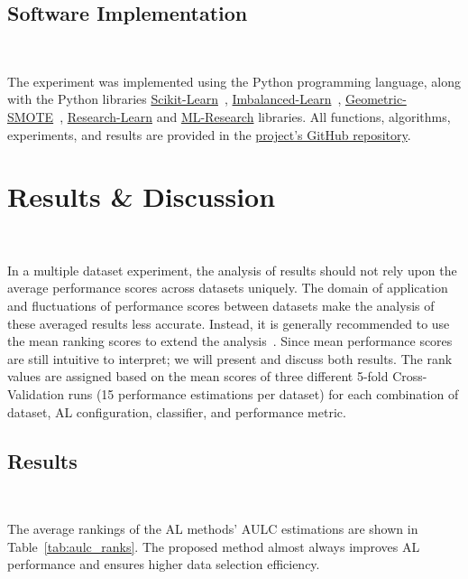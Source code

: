 \documentclass[parskip=full]{scrartcl}
\begin{document}
\subsection{Software Implementation}~\label{sec:software_implementation}

The experiment was implemented using the Python programming language, along
with the Python libraries
\href{https://scikit-learn.org/stable/}{Scikit-Learn}~\cite{Pedregosa2011},
\href{https://imbalanced-learn.org/en/stable/}{Imbalanced-Learn}~\cite{JMLR:v18:16-365},
\href{https://geometric-smote.readthedocs.io/en/latest/?badge=latest}{Geometric-SMOTE}~\cite{Douzas2019},
\href{https://research-learn.readthedocs.io/en/latest/?badge=latest}{Research-Learn}
and
\href{https://mlresearch.readthedocs.io/en/latest/?badge=latest}{ML-Research}
libraries. All functions, algorithms, experiments, and results are provided in
the \href{https://github.com/joaopfonseca/publications/}{project's GitHub
repository}.

\section{Results \& Discussion}~\label{sec:results_discussion}

In a multiple dataset experiment, the analysis of results should not rely upon
the average performance scores across datasets uniquely. The domain of
application and fluctuations of performance scores between datasets make the
analysis of these averaged results less accurate. Instead, it is generally
recommended to use the mean ranking scores to extend the
analysis~\cite{Demsar2006}. Since mean performance scores are still intuitive
to interpret; we will present and discuss both results. The rank values are
assigned based on the mean scores of three different 5-fold Cross-Validation
runs (15 performance estimations per dataset) for each combination of dataset,
AL configuration, classifier, and performance metric.
 
\subsection{Results}~\label{sec:results}

The average rankings of the AL methods' AULC estimations are shown in
Table~\ref{tab:aulc_ranks}. The proposed method almost always improves AL
performance and ensures higher data selection efficiency.
 
\begin{table}[t]
	\centering
    \caption{%
        Mean rankings of the AULC metric over the different datasets (15),
        folds (5), and runs (3) used in the experiment. The proposed method
        constantly improves the results of the original framework and, on
        average, almost always improves the results of the oversampling
        framework.
    }\label{tab:aulc_ranks}
\end{table}
 
\end{document}
